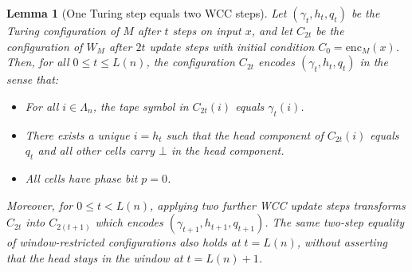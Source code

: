 \documentclass[12pt]{article}
\newtheorem{lemma}[theorem]{Lemma}
\begin{document}
\begin{lemma}[One Turing step equals two WCC steps]
\label{lem:one_step}
Let $(\gamma_t, h_t, q_t)$ be the Turing configuration of $M$ after $t$ steps
on input $x$, and let $C_{2t}$ be the configuration of $W_M$ after $2t$ update
steps with initial condition $C_0 = \mathrm{enc}_M(x)$. Then, for all
$0\le t\le L(n)$, the configuration $C_{2t}$ encodes $(\gamma_t, h_t, q_t)$ in the sense that:
\begin{itemize}
  \item For all $i \in \Lambda_n$, the tape symbol in $C_{2t}(i)$ equals
    $\gamma_t(i)$.
  \item There exists a unique $i = h_t$ such that the head component of
    $C_{2t}(i)$ equals $q_t$ and all other cells carry $\bot$ in the head
    component.
  \item All cells have phase bit $p=0$.
\end{itemize}
Moreover, for $0\le t<L(n)$, applying two further WCC update steps transforms $C_{2t}$ into
$C_{2(t+1)}$ which encodes $(\gamma_{t+1}, h_{t+1}, q_{t+1})$. The same two-step
equality of window-restricted configurations also holds at $t=L(n)$,
without asserting that the head stays in the window at $t=L(n)+1$.
\end{lemma}
\end{document}
